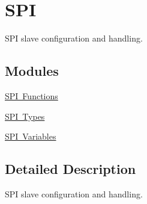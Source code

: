 \hypertarget{group___s_d___s_p_i}{}\section{S\+PI}
\label{group___s_d___s_p_i}


S\+PI slave configuration and handling.  


\subsection*{Modules}
\begin{DoxyCompactItemize}
\item 
\mbox{\hyperlink{group___s_d___s_p_i___functions}{S\+P\+I Functions}}
\item 
\mbox{\hyperlink{group___s_d___s_p_i___types}{S\+P\+I Types}}
\item 
\mbox{\hyperlink{group___s_d___s_p_i___variables}{S\+P\+I Variables}}
\end{DoxyCompactItemize}


\subsection{Detailed Description}
S\+PI slave configuration and handling. 

